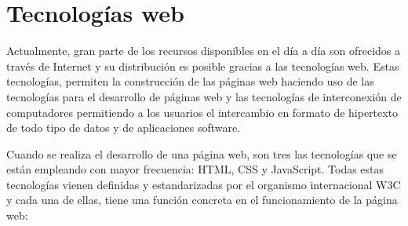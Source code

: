 \section{Tecnologías web}
\label{sec:tecnologias_web}

Actualmente, gran parte de los recursos disponibles en el día a día son ofrecidos a través de Internet y su distribución es posible gracias a las tecnologías web. Estas tecnologías, permiten la construcción de las páginas web haciendo uso de las tecnologías para el desarrollo de páginas web y las tecnologías de interconexión de computadores permitiendo a los usuarios el intercambio en formato de hipertexto de todo tipo de datos y de aplicaciones software.

Cuando se realiza el desarrollo de una página web, son tres las tecnologías que se están empleando con mayor frecuencia: HTML, CSS y JavaScript. Todas estas tecnologías vienen definidas y estandarizadas por el organismo internacional W3C y cada una de ellas, tiene una función concreta en el funcionamiento de la página web:

